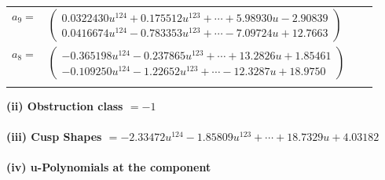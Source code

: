 \documentclass[1p]{elsarticle_modified}
\theoremstyle{definition}
\begin{document}
\begin{tabular}{m{7pt} m{180pt} m{7pt} m{180pt} }
\flushright $a_{9}=$&$\begin{pmatrix}0.0322430 u^{124}+0.175512 u^{123}+\cdots+5.98930 u-2.90839\\0.0416674 u^{124}-0.783353 u^{123}+\cdots-7.09724 u+12.7663\end{pmatrix}$ \\
\flushright $a_{8}=$&$\begin{pmatrix}-0.365198 u^{124}-0.237865 u^{123}+\cdots+13.2826 u+1.85461\\-0.109250 u^{124}-1.22652 u^{123}+\cdots-12.3287 u+18.9750\end{pmatrix}$\\&\end{tabular}
\flushleft \textbf{(ii) Obstruction class $= -1$}\\~\\
\flushleft \textbf{(iii) Cusp Shapes $= -2.33472 u^{124}-1.85809 u^{123}+\cdots+18.7329 u+4.03182$}\\~\\
\newpage\renewcommand{\arraystretch}{1}
\flushleft \textbf{(iv) u-Polynomials at the component}\newline \\
\end{document}
